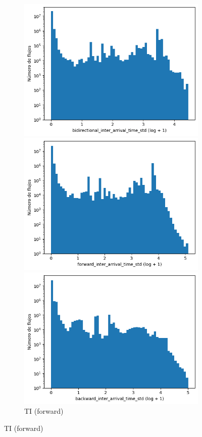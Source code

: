 \begin{figure}[H]
\begin{subfigure}[b]{0.26\textwidth}
        \includegraphics[width=\linewidth]{media/packet_pincer_toniot/bidirectional_inter_arrival_time_std_log_x_log_y.png}
        \caption{TI (bidir.)}
        \includegraphics[width=\textwidth]{media/packet_pincer_toniot/forward_inter_arrival_time_std_log_x_log_y.png}
        \caption{TI (forward)}
        \includegraphics[width=\textwidth]{media/packet_pincer_toniot/backward_inter_arrival_time_std_log_x_log_y.png}

\end{subfigure}
\end{figure}

